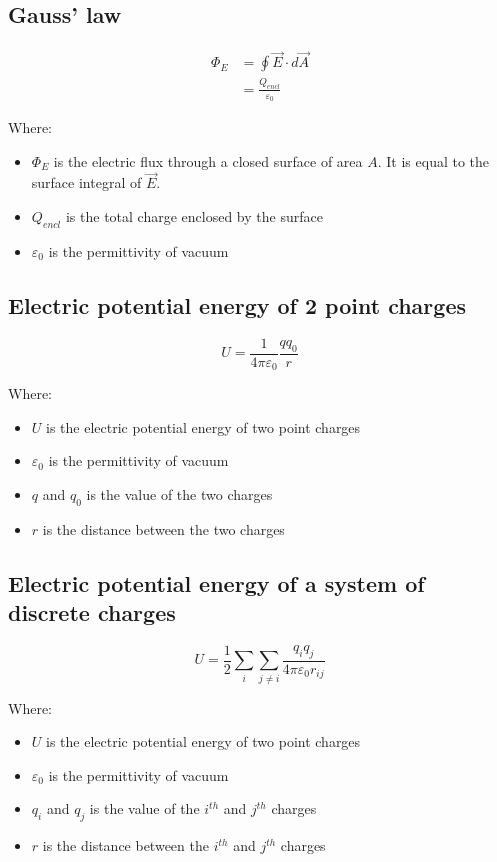 \documentclass[11pt]{article}
\begin{document}
\subsection{Gauss' law}
\label{sec:orgb0afcb4}
\begin{align*}
\Phi_E &= \oint \vec{E} \cdot d \vec{A} \\
&= \frac{Q_{encl}}{\varepsilon_0}
\end{align*}

Where:
\begin{itemize}
\item \(\Phi_E\) is the electric flux through a closed surface of area \(A\). It is equal to the surface integral of \(\vec{E}\).
\item \(Q_{encl}\) is the total charge enclosed by the surface
\item \(\varepsilon_0\) is the permittivity of vacuum
\end{itemize}
\subsection{Electric potential energy of 2 point charges}
\label{sec:org38ca85a}
\[U = \frac{1}{4 \pi \varepsilon_0} \frac{qq_0}{r}\]

Where:
\begin{itemize}
\item \(U\) is the electric potential energy of two point charges
\item \(\varepsilon_0\) is the permittivity of vacuum
\item \(q\) and \(q_0\) is the value of the two charges
\item \(r\) is the distance between the two charges
\end{itemize}
\subsection{Electric potential energy of a system of discrete charges}
\label{sec:orge9106cc}
\[U = \frac{1}{2} \sum_{i} \sum_{j \ne i} \frac{q_i q_j}{4 \pi \varepsilon_0 r_{ij}}\]

Where:
\begin{itemize}
\item \(U\) is the electric potential energy of two point charges
\item \(\varepsilon_0\) is the permittivity of vacuum
\item \(q_i\) and \(q_j\) is the value of the \(i^{th}\) and \(j^{th}\) charges
\item \(r\) is the distance between the \(i^{th}\) and \(j^{th}\) charges
\end{itemize}
\end{document}
